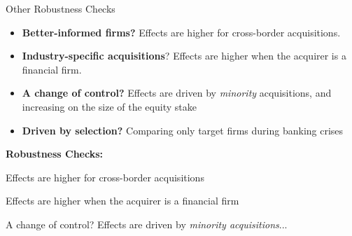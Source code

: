 \documentclass[10pt]{beamer}
\begin{document}
\begin{frame}{Other Robustness Checks}\label{P1_Results}

\begin{itemize}

    
\item \textbf{Better-informed firms?} Effects are higher for cross-border acquisitions.         

\item  \textbf{Industry-specific acquisitions}? Effects are higher when the acquirer is a financial firm.

\item \textbf{A change of control?} Effects are driven by \textit{minority} acquisitions, and increasing on the size of the equity stake

\item \textbf{Driven by selection?} Comparing only target firms during banking crises 

\end{itemize}
\vspace{3mm}

\textbf{Robustness Checks:} \hyperlink{P13}{}
\vspace{3mm}


\end{frame}




\begin{frame}{Effects are higher for cross-border acquisitions}\label{P13}

\hyperlink{P1_Results}{}
\end{frame}

\begin{frame}{Effects are higher when the acquirer is a financial firm}\label{P13}

\hyperlink{P1_Results}{}
\end{frame}

\begin{frame}{A change of control? Effects are driven by \textit{minority acquisitions}...}\label{P13}

\hyperlink{P1_Results}{}
\end{frame}
\end{document}

